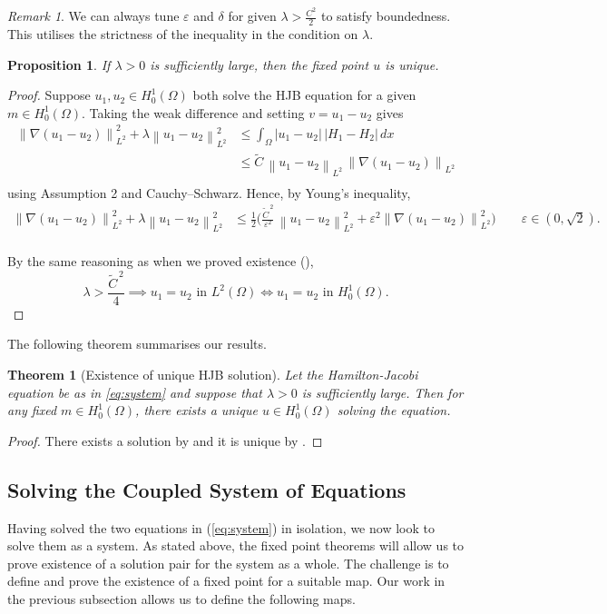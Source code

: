 \documentclass[11pt]{article}
\numberwithin{equation}{section}
\newtheorem{theorem}{Theorem}[section]
\newtheorem{proposition}[proposition]{Proposition}
\theoremstyle{definition}
\theoremstyle{remark}
\newtheorem{remark}[remark]{Remark}
\newcommand{\Ltwo}{L^2(\Omega)}
\newcommand{\Honez}{H_0^1(\Omega)}
\newcommand{\norm}[1]{\left\lVert #1 \right\rVert}
\begin{document}
\begin{remark}
  We can always tune $\varepsilon$ and $\delta$ for given $\lambda>\frac{C^2}{2}$ to satisfy boundedness. This utilises the
  strictness of the inequality in the condition on $\lambda$.
\end{remark}
\begin{proposition}
\label{prop:uniqueness}
If $\lambda>0$ is sufficiently large, then the fixed point $u$ is unique.
\end{proposition}
\begin{proof}
Suppose $u_1,u_2 \in \Honez$ both solve the HJB equation for a given $m \in \Honez$. Taking the weak difference and setting $v=u_1-u_2$ gives
\begin{align*}
  \norm{\nabla(u_1-u_2)}_{L^2}^2+\lambda\norm{u_1-u_2}_{L^2}^2
  &\le \int_\Omega |u_1-u_2|\,|H_1-H_2|\,dx\\[0.7em]
  &\le \tilde{C}\,\norm{u_1-u_2}_{L^2}\,\norm{\nabla(u_1-u_2)}_{L^2}\\
\end{align*}
using Assumption 2 and Cauchy--Schwarz. Hence, by Young's inequality,
\begin{align*}
  \norm{\nabla(u_1-u_2)}_{L^2}^2+\lambda\norm{u_1-u_2}_{L^2}^2 
  &\le \frac12 \bigl(\frac{\tilde{C}^{\,2}}{\varepsilon^2}\,\norm{u_1-u_2}^2_{L^2} +\varepsilon^2 \norm{\nabla(u_1-u_2)}^2_{L^2}\bigr)
  \qquad \varepsilon\in (0, \sqrt{2}).\\
\end{align*}

By the same reasoning as when we proved existence (), 
\[\lambda>\frac{\tilde{C}^{\,2}}{4}\implies u_1=u_2 \text{ in }\Ltwo\iff u_1=u_2 \text{ in }\Honez.\]
\end{proof}
The following theorem summarises our results. 
\begin{theorem}[Existence of unique HJB solution]
  \label{thm:solution_hjb}
  Let the Hamilton-Jacobi equation be as in \cref{eq:system} and suppose that $\lambda > 0$ is sufficiently large. Then for any fixed $m \in \Honez$, there exists
  a unique $u \in \Honez$ solving the equation. 
\end{theorem}
\begin{proof}
  There exists a solution by  and it is unique by .
\end{proof}
\subsection{Solving the Coupled System of Equations}
Having solved the two equations in (\ref{eq:system}) in isolation, we now look to solve them as a system. As stated above, the fixed point theorems 
will allow us to prove existence of a solution pair for the system as a whole. The challenge is to define and 
prove the existence of a fixed point for a suitable map.
Our work in the previous subsection allows us to define the following maps.
\end{document}
